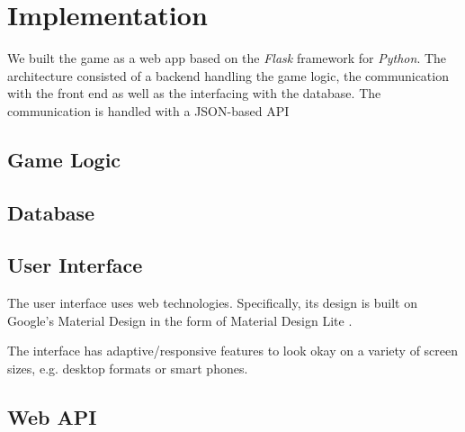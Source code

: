 \section{Implementation}
\label{gXLII:sec:implementation}  %


We built the game as a web app based on the \textit{Flask} framework for \textit{Python}. The architecture consisted of a backend handling the game logic, the communication with the front end as well as the interfacing with the database. The communication is handled with a JSON-based API

\subsection{Game Logic}
\label{gXLII:sec:implementation:game}  %

\subsection{Database}
\label{gXLII:sec:implementation:database}  %


\subsection{User Interface}
\label{gXLII:sec:implementation:UI}  %

The user interface uses web technologies. Specifically, its design is built on Google's Material Design in the form of Material Design Lite . 

The interface has adaptive/responsive features to look okay on a variety of screen sizes, e.g. desktop formats or smart phones. 

\subsection{Web API}
\label{gXLII:sec:implementation:API}  %





